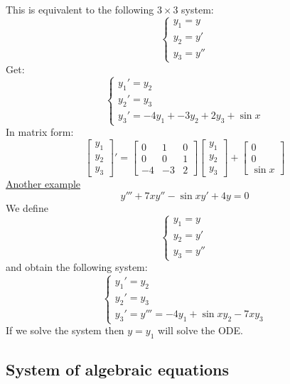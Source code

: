 \documentclass{article}
\begin{document}
This is equivalent to the following $3 \times 3$ system:
\[ \left\{\begin{array}{l}
     y_1 = y\\
     y_2 = y'\\
     y_3 = y''
   \end{array}\right. \]
Get:
\[ \left\{\begin{array}{l}
     y_1' = y_2\\
     y_2' = y_3\\
     y_3' = - 4 y_1 + - 3 y_2 + 2 y_3 + \sin x
   \end{array}\right. \]
In matrix form:
\[ \left[\begin{array}{c}
     y_1\\
     y_2\\
     y_3
   \end{array}\right]' = \left[\begin{array}{ccc}
     0 & 1 & 0\\
     0 & 0 & 1\\
     - 4 & - 3 & 2
   \end{array}\right] \left[\begin{array}{c}
     y_1\\
     y_2\\
     y_3
   \end{array}\right] + \left[\begin{array}{c}
     0\\
     0\\
     \sin x
   \end{array}\right] \]
{\underline{Another example}}
\[ y''' + 7 xy'' - \sin xy' + 4 y = 0 \]
We define
\[ \left\{\begin{array}{l}
     y_1 = y\\
     y_2 = y'\\
     y_3 = y''
   \end{array}\right. \]
and obtain the following system:
\[ \left\{\begin{array}{l}
     y_1' = y_2\\
     y_2' = y_3\\
     y_3' = y''' = - 4 y_1 + \sin xy_2 - 7 xy_3
   \end{array}\right. \]
If we solve the system then $y = y_1$ will solve the ODE.

\subsection{System of algebraic equations}
\end{document}
